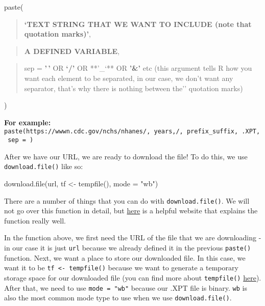\documentclass[
]{book}
\newenvironment{Shaded}{\begin{snugshade}}{\end{snugshade}}
\newcommand{\AttributeTok}[1]{\textcolor[rgb]{0.77,0.63,0.00}{#1}}
\newcommand{\FunctionTok}[1]{\textcolor[rgb]{0.00,0.00,0.00}{#1}}
\newcommand{\NormalTok}[1]{#1}
\newcommand{\OtherTok}[1]{\textcolor[rgb]{0.56,0.35,0.01}{#1}}
\newcommand{\StringTok}[1]{\textcolor[rgb]{0.31,0.60,0.02}{#1}}
\begin{document}
paste(

\begin{quote}
\textbf{`TEXT STRING THAT WE WANT TO INCLUDE (note that quotation marks)'},
\end{quote}

\begin{quote}
\textbf{A DEFINED VARIABLE},
\end{quote}

\begin{quote}
sep = \textbf{'\,'} OR \textbf{`/'} OR **'\_`** OR \textbf{'\&'} etc (this argument tells R how you want each element to be separated, in our case, we don't want any separator, that's why there is nothing between the'' quotation marks)
\end{quote}

)

\textbf{For example:} \texttt{paste(\textquotesingle{}https://wwwn.cdc.gov/nchs/nhanes/\textquotesingle{},\ years,\textquotesingle{}/\textquotesingle{},\ prefix\_suffix,\ \textquotesingle{}.XPT\textquotesingle{},\ sep\ =\ \textquotesingle{}\textquotesingle{})}

After we have our URL, we are ready to download the file! To do this, we use \texttt{download.file()} like so:

\begin{Shaded}
\begin{Highlighting}[]
\FunctionTok{download.file}\NormalTok{(url, tf }\OtherTok{\textless{}{-}} \FunctionTok{tempfile}\NormalTok{(), }\AttributeTok{mode =} \StringTok{"wb"}\NormalTok{)}
\end{Highlighting}
\end{Shaded}

There are a number of things that you can do with \texttt{download.file()}. We will not go over this function in detail, but \href{https://www.rdocumentation.org/packages/utils/versions/3.6.2/topics/download.file}{here} is a helpful website that explains the function really well.

In the function above, we first need the URL of the file that we are downloading - in our case it is just \texttt{url} because we already defined it in the previous \texttt{paste()} function. Next, we want a place to store our downloaded file. In this case, we want it to be \texttt{tf\ \textless{}-\ tempfile()} because we want to generate a temporary storage space for our downloaded file (you can find more about \texttt{tempfile()} \href{https://www.rdocumentation.org/packages/base/versions/3.6.2/topics/tempfile}{here}). After that, we need to use \texttt{mode\ =\ "wb"} because our .XPT file is binary. \texttt{wb} is also the most common mode type to use when we use \texttt{download.file()}.
\end{document}
